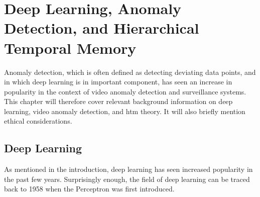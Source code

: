 \chapter{Deep Learning, Anomaly Detection, and Hierarchical Temporal Memory}
\label{sec:background}
Anomaly detection, which is often defined as detecting deviating data points, and in which deep learning is in important component, has seen an increase in popularity in the context of video anomaly detection and surveillance systems. This chapter will therefore cover relevant background information on deep learning, video anomaly detection, and \gls*{htm} theory. It will also briefly mention ethical considerations.
\section{Deep Learning}
As mentioned in the introduction, deep learning has seen increased popularity in the past few years. Surprisingly enough, the field of deep learning can be traced back to 1958 when the Perceptron\cite{perceptron,perceptron2} was first introduced.
